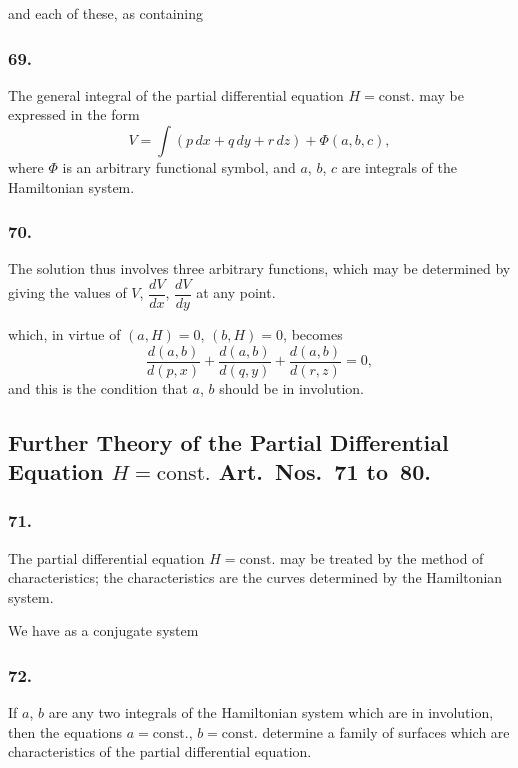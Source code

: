 \documentclass[11pt,a4paper]{book}
\begin{document}
\newpage
\setcounter{page}{144}

and each of these, as containing

\subsubsection*{69.}

The general integral of the partial differential equation $H = \text{const.}$ may be expressed in the form
\[
V = \int(p\,dx + q\,dy + r\,dz) + \Phi(a, b, c),
\]
where $\Phi$ is an arbitrary functional symbol, and $a$, $b$, $c$ are integrals of the Hamiltonian system.

\subsubsection*{70.}

The solution thus involves three arbitrary functions, which may be determined by giving the values of $V$, $\dfrac{dV}{dx}$, $\dfrac{dV}{dy}$ at any point.

\newpage
\setcounter{page}{145}

which, in virtue of $(a, H) = 0$, $(b, H) = 0$, becomes
\[
\frac{d(a, b)}{d(p, x)} + \frac{d(a, b)}{d(q, y)} + \frac{d(a, b)}{d(r, z)} = 0,
\]
and this is the condition that $a$, $b$ should be in involution.

\subsection*{Further Theory of the Partial Differential Equation $H = \text{const.}$ Art.~Nos.~71 to~80.}

\subsubsection*{71.}

The partial differential equation $H = \text{const.}$ may be treated by the method of characteristics; the characteristics are the curves determined by the Hamiltonian system.

\newpage
\setcounter{page}{146}

We have as a conjugate system

\subsubsection*{72.}

If $a$, $b$ are any two integrals of the Hamiltonian system which are in involution, then the equations $a = \text{const.}$, $b = \text{const.}$ determine a family of surfaces which are characteristics of the partial differential equation.
\end{document}
